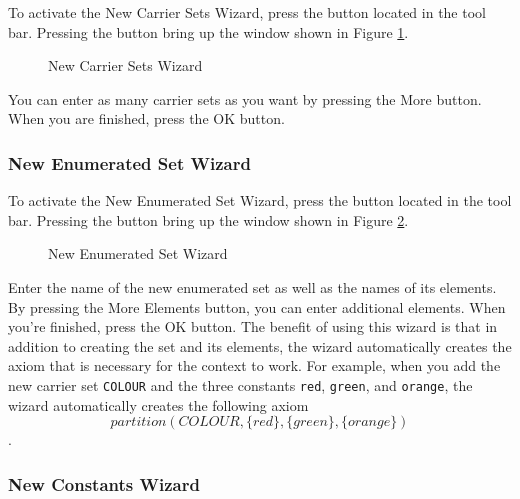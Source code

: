 To activate the \textsf{New Carrier Sets Wizard}, press the  button located in the tool bar. Pressing the button bring up the window shown in Figure \ref{fig_ref_01_eventb_editor4}.

\begin{figure}[!ht]
\begin{center}
	\caption{New Carrier Sets Wizard}
	\label{fig_ref_01_eventb_editor4}
\end{center}
\end{figure}

You can enter as many carrier sets as you want by pressing the \textsf{More} button. When you are finished, press the \textsf{OK} button. 

\subsubsection{New Enumerated Set Wizard}
\label{enumerated_set_wizard}

To activate the \textsf{New Enumerated Set Wizard}, press the  button located in the tool bar. Pressing the button bring up the window shown in Figure \ref{fig_ref_01_eventb_editor5}.

\begin{figure}[!ht]
\begin{center}
	\caption{New Enumerated Set Wizard}
	\label{fig_ref_01_eventb_editor5}
\end{center}
\end{figure}

Enter the name of the new enumerated set as well as the names of its elements. By pressing the \textsf{More Elements} button, you can enter additional elements. When you're finished, press the \textsf{OK} button. The benefit of using this wizard is that in addition to creating the set and its elements, the wizard automatically creates the axiom that is necessary for the context to work. For example, when you add the new carrier set \texttt{COLOUR} and the three constants \texttt{red}, \texttt{green}, and \texttt{orange}, the wizard automatically creates the following axiom 
\[partition(COLOUR , \{red\}, \{green\}, \{orange\})\].

\subsubsection{New Constants Wizard}

